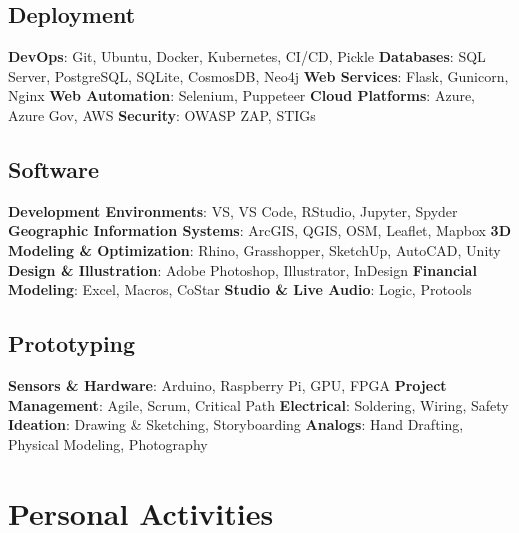 \documentclass{article}
\begin{document}
    \subsection*{Deployment}
        \textbf{DevOps}: Git, Ubuntu, Docker, Kubernetes, CI/CD, Pickle\newline
        \textbf{Databases}: SQL Server, PostgreSQL, SQLite, CosmosDB, Neo4j\newline
        \textbf{Web Services}: Flask, Gunicorn, Nginx\newline
        \textbf{Web Automation}: Selenium, Puppeteer\newline
        \textbf{Cloud Platforms}: Azure, Azure Gov, AWS\newline
        \textbf{Security}: OWASP ZAP, STIGs
    \subsection*{Software}
        \textbf{Development Environments}: VS, VS Code, RStudio, Jupyter, Spyder\newline
        \textbf{Geographic Information Systems}: ArcGIS, QGIS, OSM, Leaflet, Mapbox\newline
        \textbf{3D Modeling \& Optimization}: Rhino, Grasshopper, SketchUp, AutoCAD, Unity\newline
        \textbf{Design \& Illustration}: Adobe Photoshop, Illustrator, InDesign\newline
        \textbf{Financial Modeling}: Excel, Macros, CoStar\newline
        \textbf{Studio \& Live Audio}: Logic, Protools
    \subsection*{Prototyping}
        \textbf{Sensors \& Hardware}: Arduino, Raspberry Pi, GPU, FPGA\newline
        \textbf{Project Management}: Agile, Scrum, Critical Path\newline
        \textbf{Electrical}: Soldering, Wiring, Safety\newline
        \textbf{Ideation}: Drawing \& Sketching, Storyboarding\newline
        \textbf{Analogs}: Hand Drafting, Physical Modeling, Photography
\newpage
    \section*{Personal Activities}
\end{document}
